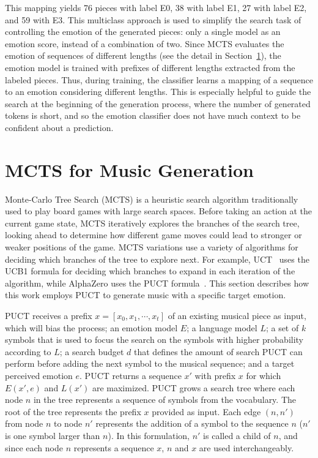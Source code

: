 This mapping yields 76 pieces with label E0, 38 with label E1, 27 with label E2, and 59 with E3. This multiclass approach is used to simplify the search task of controlling the emotion of the generated pieces: only a single model as an emotion score, instead of a combination of two. Since MCTS evaluates the emotion of sequences of different lengths (see the detail in Section~\ref{sec:puct}), the emotion model is trained with prefixes of different lengths extracted from the labeled pieces. Thus, during training, the classifier learns a mapping of a sequence to an emotion considering different lengths. This is especially helpful to guide the search at the beginning of the generation process, where the number of generated tokens is short, and so the emotion classifier does not have much context to be confident about a prediction.


\section{MCTS for Music Generation}
\label{sec:puct}

Monte-Carlo Tree Search (MCTS) is a heuristic search algorithm traditionally used to play board games with large search spaces. Before taking an action at the current game state, MCTS iteratively explores the branches of the search tree, looking ahead to determine how different game moves could lead to stronger or weaker positions of the game. MCTS variations use a variety of algorithms for deciding which branches of the tree to explore next. For example, UCT~\cite{Kocsis2006} uses the UCB1 formula for deciding which branches to expand in each iteration of the algorithm, while AlphaZero uses the PUCT formula~\cite{rosin2011pucb}. This section describes how this work employs PUCT to generate music with a specific target emotion.

PUCT receives a prefix $x = [x_0, x_1, \cdots, x_t]$ of an existing musical piece as input, which will bias the process; an emotion model $E$; a language model $L$; a set of $k$ symbols that is used to focus the search on the symbols with higher probability according to $L$; a search budget $d$ that defines the amount of search PUCT can perform before adding the next symbol to the musical sequence; and a target perceived emotion $e$. PUCT returns a sequence $x'$ with prefix $x$ for which $E(x', e)$ and $L(x')$ are maximized. PUCT grows a search tree where each node $n$ in the tree represents a sequence of symbols from the vocabulary. The root of the tree represents the prefix $x$ provided as input. Each edge $(n, n')$ from node $n$ to node $n'$ represents the addition of a symbol to the sequence $n$ ($n'$ is one symbol larger than $n$). In this formulation, $n'$ is called a child of $n$, and since each node $n$ represents a sequence $x$, $n$ and $x$ are used interchangeably.

